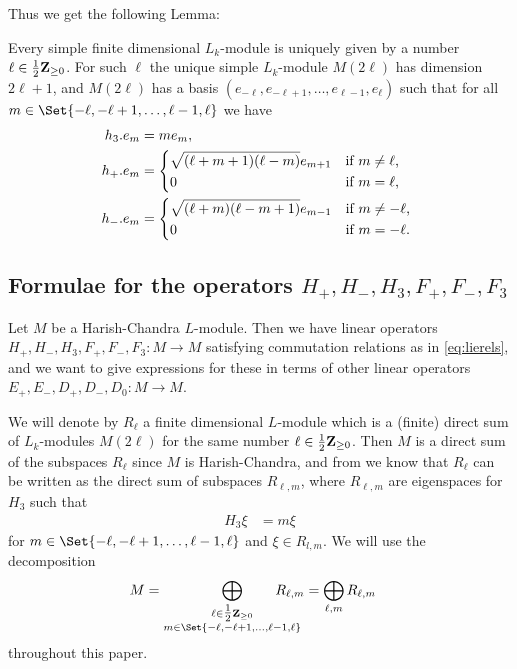 Thus we get the following Lemma:
\begin{lemma}\label{lem:modulebasis}
  Every simple finite dimensional $L_k$-module is uniquely given by a number $\ell\in\tfrac{1}{2}\mathbf{Z}_{\geq 0}$. For such $\ell$ the unique simple $L_k$-module $M(2\ell)$ has dimension $2\ell+1$, and $M(2\ell)$ has a basis $(e_{-\ell},e_{-\ell+1},\dotsc,e_{\ell-1},e_\ell)$ such that for all $m\in\Set{-\ell,-\ell+1,\dotsc,\ell-1,\ell}$ we have
  \begin{align}
    \begin{split}
      h_3.e_m &= me_m,\label{eq:modulerels} \\
      h_+.e_m &=
      \begin{dcases*}
        \sqrt{(\ell+m+1)(\ell-m)}e_{m+1} & if $m\neq \ell$, \\
        0 & if $m=\ell$,
      \end{dcases*} \\
      h_-.e_m &=
      \begin{dcases*}
        \sqrt{(\ell+m)(\ell-m+1)}e_{m-1} & if $m\neq -\ell$, \\
        0 & if $m=-\ell$.
      \end{dcases*}
    \end{split}
  \end{align}
\end{lemma}

\subsection{Formulae for the operators \texorpdfstring{$H_+,H_-,H_3,F_+,F_-,F_3$}{H\_+,H\_-,H\_3,F\_+,F\_-,F\_3}}\label{sec:formulae}

Let $M$ be a Harish-Chandra $L$-module. Then we have linear operators $H_+, H_-, H_3, F_+, F_-, F_3\colon M\to M$ satisfying commutation relations as in \cref{eq:lierels}, and we want to give expressions for these in terms of other linear operators $E_+,E_-,D_+,D_-,D_0\colon M\to M$. 

We will denote by $R_\ell$ a finite dimensional $L$-module which is a (finite) direct sum of $L_k$-modules $M(2\ell)$ for the same number $\ell\in\tfrac{1}{2}\mathbf{Z}_{\geq 0}$. Then $M$ is a direct sum of the subspaces $R_\ell$ since $M$ is Harish-Chandra, and from  we know that $R_\ell$ can be written as the direct sum of subspaces $R_{\ell,m}$, where $R_{\ell,m}$ are eigenspaces for $H_3$ such that
\begin{align} \label{eq:H3eigen}
  H_3\xi &= m\xi
\end{align}
for $m\in\Set{-\ell,-\ell+1,\dotsc,\ell-1,\ell}$ and $\xi\in R_{l,m}$. We will use the decomposition
\begin{align*}
  M &= \bigoplus_{\substack{\ell\in\tfrac{1}{2}\Z_{\geq 0} \\ m\in\Set{-\ell,-\ell+1,\dotsc,\ell-1,\ell}}} \!\!\!\!\!\!\!\!\!\!\!\! R_{\ell,m} = \bigoplus_{\ell,m} R_{\ell,m}
\end{align*}
throughout this paper.

